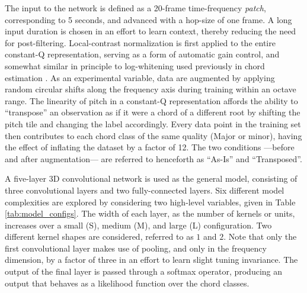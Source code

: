 The input to the network is defined as a 20-frame time-frequency \emph{patch}, corresponding to 5 seconds, and advanced with a hop-size of one frame.
A long input duration is chosen in an effort to learn context, thereby reducing the need for post-filtering.
Local-contrast normalization is first applied to the entire constant-Q representation, serving as a form of automatic gain control, and somewhat similar in principle to log-whitening used previously in chord estimation \cite{Cho2010Exploring}.
As an experimental variable, data are augmented by applying random circular shifts along the frequency axis during training within an octave range.
The linearity of pitch in a constant-Q representation affords the ability to ``transpose'' an observation as if it were a chord of a different root by shifting the pitch tile and changing the label accordingly.
Every data point in the training set then contributes to each chord class of the same quality (Major or minor), having the effect of inflating the dataset by a factor of 12.
The two conditions ---before and after augmentation--- are referred to henceforth as ``As-Is'' and ``Transposed''.

A five-layer 3D convolutional network is used as the general model, consisting of three convolutional layers and two fully-connected layers. %
Six different model complexities are explored by considering two high-level variables, given in Table \ref{tab:model_configs}.
The width of each layer, as the number of kernels or units, increases over a small (S), medium (M), and large (L) configuration.
Two different kernel shapes are considered, referred to as $1$ and $2$.
Note that only the first convolutional layer makes use of pooling, and only in the frequency dimension, by a factor of three in an effort to learn slight tuning invariance.
The output of the final layer is passed through a softmax operator, producing an output that behaves as a likelihood function over the chord classes.


